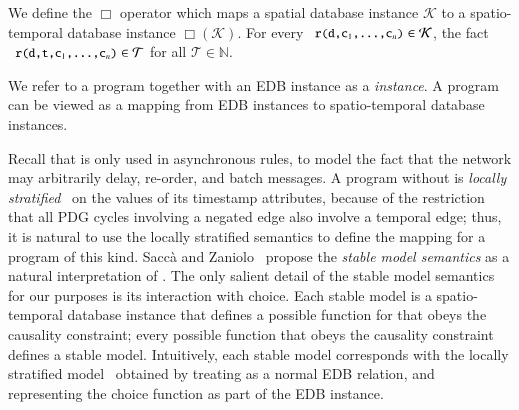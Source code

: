 We define the $\Box$ operator which maps a spatial database instance $\mathcal{K}$ to a spatio-temporal database instance $\mathcal{\Box(\mathcal{K})}$.  For every \linebreak $\dedalus{r(d,c\sub{1},\ldots,c\sub{n})} \in \mathcal{K}$,  the fact $\dedalus{r(d,t,c\sub{1},\ldots,c\sub{n})} \in \mathcal{T}$ for all $\mathcal{T} \in \mathbb{N}$.

We refer to a \lang program together with an EDB instance as a {\em \lang instance}.  A \lang program can be viewed as a mapping from EDB instances to spatio-temporal database instances.

Recall that  is only used in asynchronous rules, to model the fact that the network may arbitrarily delay, re-order, and batch messages.  A \lang program without  is {\em locally stratified}~\cite{local-strat} on the values of its timestamp attributes, because of the restriction that all PDG cycles involving a negated edge also involve a temporal edge; thus, it is natural to use the locally stratified semantics to define the mapping for a \lang program of this kind.  Sacc\`{a} and Zaniolo~\cite{sacca-zaniolo} propose the {\em stable model semantics} as a natural interpretation of .  The only salient detail of the stable model semantics for our purposes is its interaction with choice.  Each stable model is a spatio-temporal database instance that defines a possible function for  that obeys the causality constraint; every possible function that obeys the causality constraint defines a stable model.  Intuitively, each stable model corresponds with the locally stratified model~\cite{stable-model} obtained by treating  as a normal EDB relation, and representing the choice function as part of the EDB instance.

